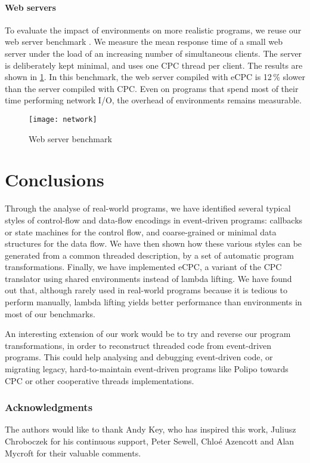 \documentclass[a4paper]{llncs}
\begin{document}
\paragraph{Web servers}

To evaluate the impact of environments on more realistic programs, we reuse our
web server benchmark \cite{kerneis2009}.  We measure the mean response time of a
small web server under the load of an increasing number of simultaneous clients.
The server is deliberately kept minimal, and uses one CPC thread per client.
The results are shown in \cref{fig:ecpc-servers}.  In this benchmark, the web
server compiled with eCPC is 12\,\% slower than the server compiled with CPC.
Even on programs that spend most of their time performing network I/O, the
overhead of environments remains measurable.
\begin{figure}[htbp]
\centering
\texttt{[image: network]}
\caption{Web server benchmark}\label{fig:ecpc-servers}
\end{figure}

\section{Conclusions}
\label{sec:conclusion}

Through the analyse of real-world programs, we have identified several typical
styles of control-flow and data-flow encodings in event-driven programs:
callbacks or state machines for the control flow, and coarse-grained or minimal
data structures for the data flow.  We have then shown how these various styles
can be generated from a common threaded description, by a set of automatic
program transformations.  Finally, we have implemented eCPC, a variant of the
CPC translator using shared environments instead of lambda lifting.  We have
found out that, although rarely used in real-world programs because it is tedious
to perform manually, lambda lifting yields better performance than environments
in most of our benchmarks.

An interesting extension of our work would be to try and reverse our program
transformations, in order to reconstruct threaded code from event-driven
programs.  This could help analysing and debugging event-driven code, or
migrating legacy, hard-to-maintain event-driven programs like Polipo towards
CPC or other cooperative threads implementations.

\subsubsection{Acknowledgments} The authors would like to thank Andy Key, who
has inspired this work, Juliusz Chroboczek for his continuous support, Peter
Sewell, Chloé Azencott and Alan Mycroft for their valuable comments.
\end{document}
